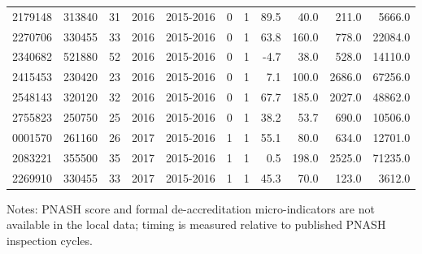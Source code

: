 \begin{table}[p]
\begin{tabular}{llllllrrrrr}
2179148 & 313840 & 31 & 2016 & 2015-2016 & 0 & 1 & 89.5 & 40.0 & 211.0 & 5666.0 \\
2270706 & 330455 & 33 & 2016 & 2015-2016 & 0 & 1 & 63.8 & 160.0 & 778.0 & 22084.0 \\
2340682 & 521880 & 52 & 2016 & 2015-2016 & 0 & 1 & -4.7 & 38.0 & 528.0 & 14110.0 \\
2415453 & 230420 & 23 & 2016 & 2015-2016 & 0 & 1 & 7.1 & 100.0 & 2686.0 & 67256.0 \\
2548143 & 320120 & 32 & 2016 & 2015-2016 & 0 & 1 & 67.7 & 185.0 & 2027.0 & 48862.0 \\
2755823 & 250750 & 25 & 2016 & 2015-2016 & 0 & 1 & 38.2 & 53.7 & 690.0 & 10506.0 \\
0001570 & 261160 & 26 & 2017 & 2015-2016 & 1 & 1 & 55.1 & 80.0 & 634.0 & 12701.0 \\
2083221 & 355500 & 35 & 2017 & 2015-2016 & 1 & 1 & 0.5 & 198.0 & 2525.0 & 71235.0 \\
2269910 & 330455 & 33 & 2017 & 2015-2016 & 1 & 1 & 45.3 & 70.0 & 123.0 & 3612.0 \\
\bottomrule
\end{tabular}
\par\medskip
\begin{minipage}{0.95\textwidth}\footnotesize Notes: PNASH score and formal de-accreditation micro-indicators are not available in the local data; timing is measured relative to published PNASH inspection cycles.\end{minipage}
\end{table}
